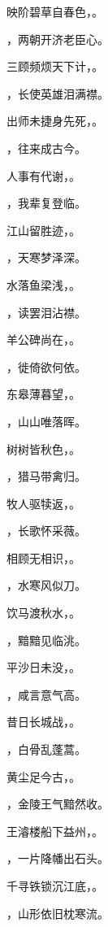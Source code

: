 \documentclass[12pt, a4paper, addpoints, answers]{exam}
\begin{document}
\begin{questions}
\question[3] 映阶碧草自春色，\fillin。

\question[3] \fillin，两朝开济老臣心。

\question[3] 三顾频烦天下计，\fillin。

\question[3] \fillin，长使英雄泪满襟。

\question[3] 出师未捷身先死，\fillin。

\question[3] \fillin，往来成古今。

\question[3] 人事有代谢，\fillin。

\question[3] \fillin，我辈复登临。

\question[3] 江山留胜迹，\fillin。

\question[3] \fillin，天寒梦泽深。

\question[3] 水落鱼梁浅，\fillin。

\question[3] \fillin，读罢泪沾襟。

\question[3] 羊公碑尚在，\fillin。

\question[3] \fillin，徙倚欲何依。

\question[3] 东皋薄暮望，\fillin。

\question[3] \fillin，山山唯落晖。

\question[3] 树树皆秋色，\fillin。

\question[3] \fillin，猎马带禽归。

\question[3] 牧人驱犊返，\fillin。

\question[3] \fillin，长歌怀采薇。

\question[3] 相顾无相识，\fillin。

\question[3] \fillin，水寒风似刀。

\question[3] 饮马渡秋水，\fillin。

\question[3] \fillin，黯黯见临洮。

\question[3] 平沙日未没，\fillin。

\question[3] \fillin，咸言意气高。

\question[3] 昔日长城战，\fillin。

\question[3] \fillin，白骨乱蓬蒿。

\question[3] 黄尘足今古，\fillin。

\question[3] \fillin，金陵王气黯然收。

\question[3] 王濬楼船下益州，\fillin。

\question[3] \fillin，一片降幡出石头。

\question[3] 千寻铁锁沉江底，\fillin。

\question[3] \fillin，山形依旧枕寒流。


\end{questions}
\end{document}
